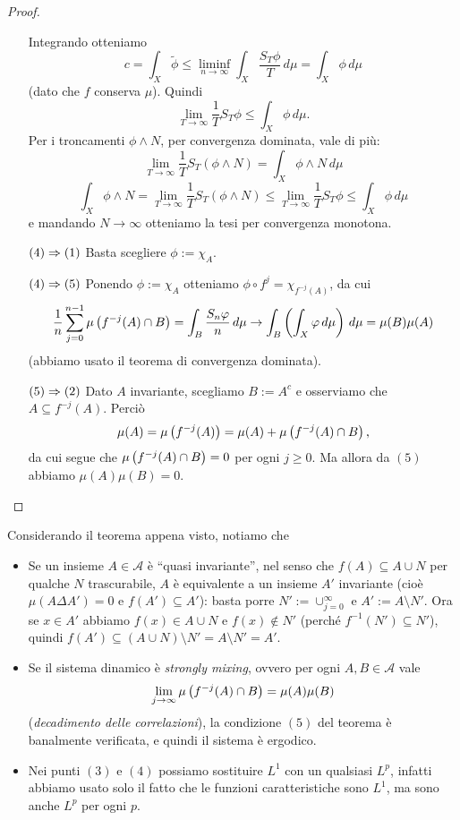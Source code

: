 \begin{proof}
\begin{itemize}
	    Integrando otteniamo 
	    \[c=\int_X\tilde{\phi} \le \liminf_{n\to\infty}\int_X\frac{S_T\phi}{T}\,d\mu=\int_X\phi\,d\mu\]
	    (dato che $f$ conserva $\mu$). Quindi 
	    \[\lim_{T\to\infty}\frac{1}{T}S_T\phi\le \int_X\phi\,d\mu.\] 
	    Per i troncamenti $\phi\wedge N$, per convergenza dominata, vale di più: 
	    \[\lim_{T\to\infty}\frac{1}{T}S_T(\phi\wedge N)=\int_X \phi\wedge N\,d\mu\]
	    \[ \int_X\phi\wedge N=\lim_{T\to\infty}\frac{1}{T}S_T(\phi\wedge N)\le\lim_{T\to\infty}\frac{1}{T}S_T\phi\le \int_X\phi\,d\mu \]
	    e mandando $N\to\infty$ otteniamo la tesi per convergenza monotona.
    \item[$(4)\Rightarrow (1)$] Basta scegliere $\phi:=\chi_A$.
    \item[$(4)\Rightarrow(5)$] Ponendo $\phi:=\chi_A$ otteniamo $\phi\circ f^j=\chi_{f^{-j}(A)}$, da cui
	    \[ \frac{1}{n}\sum_{j=0}^{n-1}\mu\left(f^{-j}(A)\cap B\right)=\int_B\frac{S_n\varphi}{n}\,d\mu\to\int_B\left(\int_X\varphi\,d\mu\right)\,d\mu=\mu(B)\mu(A) \]
	    (abbiamo usato il teorema di convergenza dominata).
    \item[$(5)\Rightarrow (2)$] Dato $A$ invariante, scegliamo $B:=A^c$ e osserviamo che $A\subseteq f^{-j}(A)$. Perciò
	    \[ \mu(A)=\mu\left(f^{-j}(A)\right)=\mu(A)+\mu\left(f^{-j}(A)\cap B\right), \]
	    da cui segue che $\mu\left(f^{-j}(A)\cap B\right)=0$ per ogni $j\ge 0$. Ma allora da $(5)$ abbiamo $\mu(A)\mu(B)=0$.
      \end{itemize}
\end{proof}

\begin{oss} Considerando il teorema appena visto, notiamo che \begin{itemize}
    \item Se un insieme $A\in\mathcal{A}$ è ``quasi invariante'', nel senso che $f(A)\subseteq A\cup N$ per qualche
      $N$ trascurabile, $A$ è equivalente a un insieme $A'$ invariante (cioè $\mu(A\Delta A')=0$ e $f(A')\subseteq A'$):
      basta porre $N':=\cup_{j=0}^\infty$ e $A':=A\setminus N'$. Ora se $x\in A'$ abbiamo
      $f(x)\in A\cup N$ e $f(x)\nin N'$ (perché $f^{-1}(N')\subseteq N'$), quindi $f(A')\subseteq (A\cup N)\setminus N'=A\setminus N'=A'$.
    \item Se il sistema dinamico è \emph{strongly mixing}, ovvero per ogni $A,B\in\mathcal{A}$ vale
      \[\lim_{j\to\infty}\mu\left(f^{-j}(A)\cap B\right)=\mu(A)\mu(B)\] 
      (\emph{decadimento delle correlazioni}), la condizione $(5)$ del teorema è banalmente verificata, e quindi il sistema è ergodico.
    \item Nei punti $(3)$ e $(4)$ possiamo sostituire $L^1$ con un qualsiasi $L^p$, infatti abbiamo usato solo il fatto che le funzioni caratteristiche sono $L^1$, 
      ma sono anche $L^p$ per ogni $p$.
\end{itemize}
\end{oss}


